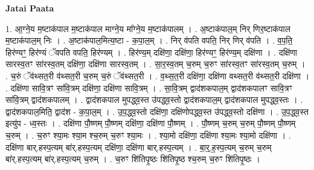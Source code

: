 \documentclass[17pt]{extarticle}
\begin{document}
\textbf{Jatai Paata} \newline

1. आ॒ग्ने॒य म॒ष्टाक॑पाल म॒ष्टाक॑पाल माग्ने॒य मा᳚ग्ने॒य म॒ष्टाक॑पालम् । . अ॒ष्टाक॑पाल॒म् निर् णिर॒ष्टाक॑पाल म॒ष्टाक॑पाल॒म् निः । . अ॒ष्टाक॑पाल॒मित्य॒ष्टा - क॒पा॒ल॒म् । . निर् व॑पति वपति॒ निर् णिर् व॑पति । . व॒प॒ति॒ हिर॑ण्यꣳ॒॒ हिर॑ण्यं ॅवपति वपति॒ हिर॑ण्यम् । . हिर॑ण्य॒म् दक्षि॑णा॒ दक्षि॑णा॒ हिर॑ण्यꣳ॒॒ हिर॑ण्य॒म् दक्षि॑णा । . दक्षि॑णा सारस्व॒तꣳ सा॑रस्व॒तम् दक्षि॑णा॒ दक्षि॑णा सारस्व॒तम् । . सा॒र॒स्व॒तम् च॒रुम् च॒रुꣳ सा॑रस्व॒तꣳ सा॑रस्व॒तम् च॒रुम् । . च॒रुं ॅव॑थ्सत॒री व॑थ्सत॒री च॒रुम् च॒रुं ॅव॑थ्सत॒री । . व॒थ्स॒त॒री दक्षि॑णा॒ दक्षि॑णा वथ्सत॒री व॑थ्सत॒री दक्षि॑णा । . दक्षि॑णा सावि॒त्रꣳ सा॑वि॒त्रम् दक्षि॑णा॒ दक्षि॑णा सावि॒त्रम् । . सा॒वि॒त्रम् द्वाद॑शकपाल॒म् द्वाद॑शकपालꣳ सावि॒त्रꣳ सा॑वि॒त्रम् द्वाद॑शकपालम् । . द्वाद॑शकपाल मुपद्ध्व॒स्त उ॑पद्ध्व॒स्तो द्वाद॑शकपाल॒म् द्वाद॑शकपाल मुपद्ध्व॒स्तः । . द्वाद॑शकपाल॒मिति॒ द्वाद॑श - क॒पा॒ल॒म् । . उ॒प॒द्ध्व॒स्तो दक्षि॑णा॒ दक्षि॑णोपद्ध्व॒स्त उ॑पद्ध्व॒स्तो दक्षि॑णा । . उ॒प॒द्ध्व॒स्त इत्यु॑प - ध्व॒स्तः । . दक्षि॑णा पौ॒ष्णम् पौ॒ष्णम् दक्षि॑णा॒ दक्षि॑णा पौ॒ष्णम् । . पौ॒ष्णम् च॒रुम् च॒रुम् पौ॒ष्णम् पौ॒ष्णम् च॒रुम् । . च॒रुꣳ श्या॒मः श्या॒म श्च॒रुम् च॒रुꣳ श्या॒मः । . श्या॒मो दक्षि॑णा॒ दक्षि॑णा श्या॒मः श्या॒मो दक्षि॑णा । . दक्षि॑णा बार्.हस्प॒त्यम् बा॑र्.हस्प॒त्यम् दक्षि॑णा॒ दक्षि॑णा बार्.हस्प॒त्यम् । . बा॒र्॒.ह॒स्प॒त्यम् च॒रुम् च॒रुम् बा॑र्.हस्प॒त्यम् बा॑र्.हस्प॒त्यम् च॒रुम् । . च॒रुꣳ शि॑तिपृ॒ष्ठः शि॑तिपृ॒ष्ठ श्च॒रुम् च॒रुꣳ शि॑तिपृ॒ष्ठः । \newline
\end{document}
